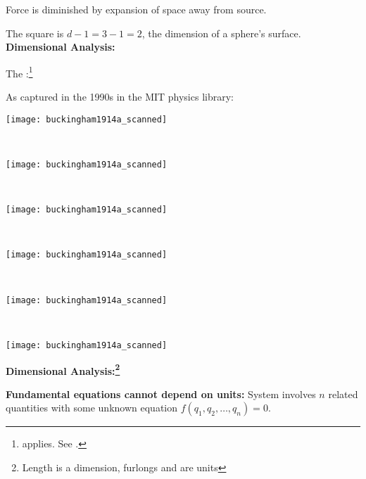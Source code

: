 Force is diminished by expansion of space away from source.  

The square is $d-1=3-1=2$, the dimension of
a sphere's surface.
\textbf{Dimensional Analysis:}

The 
:\footnote{ applies.
  See .
}

\medskip


\bigskip

As captured in the 1990s in the MIT physics library:

\medskip

\begin{marginfigure}[]
  \texttt{[image: buckingham1914a\_scanned]}
\end{marginfigure}

\
\begin{marginfigure}[]
  \texttt{[image: buckingham1914a\_scanned]}
\end{marginfigure}

\
\begin{marginfigure}[]
  \texttt{[image: buckingham1914a\_scanned]}
\end{marginfigure}

\
\begin{marginfigure}[]
  \texttt{[image: buckingham1914a\_scanned]}
\end{marginfigure}

\
\begin{marginfigure}[]
  \texttt{[image: buckingham1914a\_scanned]}
\end{marginfigure}

\
\begin{marginfigure}[]
  \texttt{[image: buckingham1914a\_scanned]}
\end{marginfigure}

\small
\textbf{Dimensional Analysis:\footnote{Length is a dimension,
    furlongs and  are units}}

\textbf{Fundamental equations cannot depend on units:}
System involves $n$ related quantities with some unknown equation $f(q_1, q_2, \ldots, q_n) = 0$.

